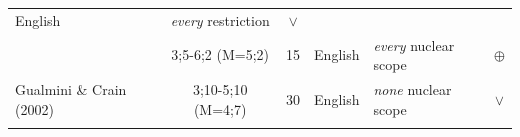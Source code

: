 \documentclass[oneside]{report}
\theoremstyle{definition}
\theoremstyle{definition}
\theoremstyle{definition}
\theoremstyle{remark}
\begin{document}
\begin{longtable}[]{@{}lccclc@{}}
\begin{minipage}[t]{0.10\columnwidth}
English\strut
\end{minipage} & \begin{minipage}[t]{0.25\columnwidth}\raggedright\strut
\emph{every} restriction\strut
\end{minipage} & \begin{minipage}[t]{0.13\columnwidth}\centering\strut
\(\lor\)\strut
\end{minipage}\tabularnewline
\begin{minipage}[t]{0.23\columnwidth}\raggedright\strut
\strut
\end{minipage} & \begin{minipage}[t]{0.07\columnwidth}\centering\strut
3;5-6;2 (M=5;2)\strut
\end{minipage} & \begin{minipage}[t]{0.05\columnwidth}\centering\strut
15\strut
\end{minipage} & \begin{minipage}[t]{0.10\columnwidth}\centering\strut
English\strut
\end{minipage} & \begin{minipage}[t]{0.25\columnwidth}\raggedright\strut
\emph{every} nuclear scope\strut
\end{minipage} & \begin{minipage}[t]{0.13\columnwidth}\centering\strut
\(\oplus\)\strut
\end{minipage}\tabularnewline
\begin{minipage}[t]{0.23\columnwidth}\raggedright\strut
Gualmini \& Crain (2002)\strut
\end{minipage} & \begin{minipage}[t]{0.07\columnwidth}\centering\strut
3;10-5;10 (M=4;7)\strut
\end{minipage} & \begin{minipage}[t]{0.05\columnwidth}\centering\strut
30\strut
\end{minipage} & \begin{minipage}[t]{0.10\columnwidth}\centering\strut
English\strut
\end{minipage} & \begin{minipage}[t]{0.25\columnwidth}\raggedright\strut
\emph{none} nuclear scope\strut
\end{minipage} & \begin{minipage}[t]{0.13\columnwidth}\centering\strut
\(\lor\)\strut
\end{minipage}\tabularnewline
\begin{minipage}[t]{0.23\columnwidth}\raggedright\strut

\end{minipage}
\end{longtable}
\end{document}
